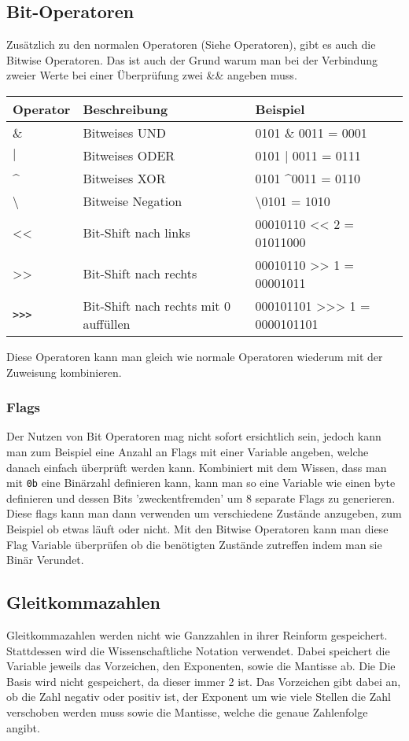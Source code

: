 \documentclass{article}
\begin{document}
	  \subsection{Bit-Operatoren}
	  Zusätzlich zu den normalen Operatoren (Siehe Operatoren), gibt es auch die Bitwise Operatoren. Das ist auch der Grund warum man bei der Verbindung zweier Werte bei einer Überprüfung zwei \&\& angeben muss. \\
	  \begin{tabular}{| l | l | l |}
	  	\toprule
	  	Operator & Beschreibung & Beispiel \\ \midrule
	  	\& & Bitweises UND & 0101 \& 0011 = 0001 \\ \hline
	  	$\vert$ & Bitweises ODER & 0101 $\vert$ 0011 = 0111 \\ \hline
	  	\textasciicircum & Bitweises XOR & 0101 \textasciicircum 0011 = 0110 \\ \hline
	  	\textbackslash & Bitweise Negation & \textbackslash 0101 = 1010 \\ \hline
	  	<< & Bit-Shift nach links & 00010110 << 2 = 01011000 \\ \hline
	  	>> & Bit-Shift nach rechts & 00010110 >> 1 = 00001011 \\ \hline
	  	\verb|>>>| & Bit-Shift nach rechts mit 0 auffüllen & 000101101 >>> 1 = 0000101101 \\
 	  	\bottomrule
	  \end{tabular}
	  Diese Operatoren kann man gleich wie normale Operatoren wiederum mit der Zuweisung kombinieren.
	  \subsubsection{Flags}
	  Der Nutzen von Bit Operatoren mag nicht sofort ersichtlich sein, jedoch kann man zum Beispiel eine Anzahl an Flags mit einer Variable angeben, welche danach einfach überprüft werden kann. Kombiniert mit dem Wissen, dass man mit \verb|0b| eine Binärzahl definieren kann, kann man so eine Variable wie einen byte definieren und dessen Bits 'zweckentfremden' um 8 separate Flags zu generieren. Diese flags kann man dann verwenden um verschiedene Zustände anzugeben, zum Beispiel ob etwas läuft oder nicht. Mit den Bitwise Operatoren kann man diese Flag Variable überprüfen ob die benötigten Zustände zutreffen indem man sie Binär Verundet.
	  \subsection{Gleitkommazahlen}
	  Gleitkommazahlen werden nicht wie Ganzzahlen in ihrer Reinform gespeichert. Stattdessen wird die Wissenschaftliche Notation verwendet. Dabei speichert die Variable jeweils das Vorzeichen, den Exponenten, sowie die Mantisse ab. Die Die Basis wird nicht gespeichert, da dieser immer 2 ist. Das Vorzeichen gibt dabei an, ob die Zahl negativ oder positiv ist, der Exponent um wie viele Stellen die Zahl verschoben werden muss sowie die Mantisse, welche die genaue Zahlenfolge angibt. 
\end{document}
